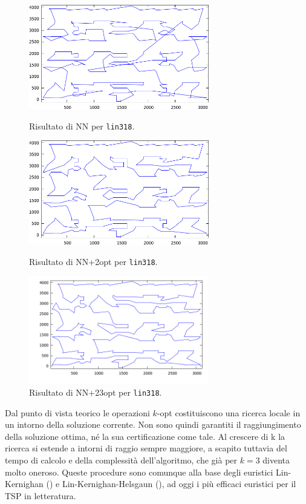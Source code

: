 \begin{figure}
  \begin{center}
    \includegraphics[width=0.7\textwidth]{images/lin318nn}
    \caption{Risultato di NN per \texttt{lin318}.}
    \label{fig:nn}

    \includegraphics[width=0.7\textwidth]{images/lin318nn2opt}
    \caption{Risultato di NN+2opt per \texttt{lin318}.}
    \label{fig:nn2opt}
  
    \includegraphics[width=0.7\textwidth]{images/lin318nn23opt}
    \caption{Risultato di NN+23opt per \texttt{lin318}.}
    \label{fig:nn23opt}
  \end{center}
\end{figure}

Dal punto di vista teorico le operazioni $k$-opt costituiscono una ricerca locale in un intorno della soluzione corrente. Non sono quindi garantiti il raggiungimento della soluzione ottima, né la sua certificazione come tale. Al crescere di k la ricerca si estende a intorni di raggio sempre maggiore, a scapito tuttavia del tempo di calcolo e della complessità dell’algoritmo, che già per $k=3$ diventa molto oneroso. Queste procedure sono comunque alla base degli euristici Lin-Kernighan (\citet*{lin1973effective}) e Lin-Kernighan-Helsgaun (\citet*{helsgaun2000effective}), ad oggi i più efficaci euristici per il TSP in letteratura.

